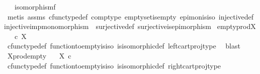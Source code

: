 \begin{isabellebody}
\ \ \ {\isachardoublequoteopen}isomorphism{\isacharparenleft}{\kern0pt}f{\isacharparenright}{\kern0pt}{\isachardoublequoteclose}\isanewline
%
\isadelimproof
\ \ %
\endisadelimproof
%
\isatagproof
{}\isamarkupfalse%
\ {\isacharparenleft}{\kern0pt}metis\ assms\ cfunc{\isacharunderscore}{\kern0pt}type{\isacharunderscore}{\kern0pt}def\ comp{\isacharunderscore}{\kern0pt}type\ emptyset{\isacharunderscore}{\kern0pt}is{\isacharunderscore}{\kern0pt}empty\ epi{\isacharunderscore}{\kern0pt}mon{\isacharunderscore}{\kern0pt}is{\isacharunderscore}{\kern0pt}iso\ injective{\isacharunderscore}{\kern0pt}def\ injective{\isacharunderscore}{\kern0pt}imp{\isacharunderscore}{\kern0pt}monomorphism\ \ surjective{\isacharunderscore}{\kern0pt}def\ surjective{\isacharunderscore}{\kern0pt}is{\isacharunderscore}{\kern0pt}epimorphism{\isacharparenright}{\kern0pt}%
\endisatagproof
{\isafoldproof}%
%
\isadelimproof
\isanewline
%
\endisadelimproof
\isanewline
{}\isamarkupfalse%
\ empty{\isacharunderscore}{\kern0pt}prod{\isacharunderscore}{\kern0pt}X{\isacharcolon}{\kern0pt}\isanewline
\ \ {\isachardoublequoteopen}{\isasymemptyset}\ {\isasymtimes}\isactrlsub c\ X\ {\isasymcong}\ {\isasymemptyset}{\isachardoublequoteclose}\isanewline
%
\isadelimproof
\ \ %
\endisadelimproof
%
\isatagproof
{}\isamarkupfalse%
\ cfunc{\isacharunderscore}{\kern0pt}type{\isacharunderscore}{\kern0pt}def\ function{\isacharunderscore}{\kern0pt}to{\isacharunderscore}{\kern0pt}empty{\isacharunderscore}{\kern0pt}is{\isacharunderscore}{\kern0pt}iso\ is{\isacharunderscore}{\kern0pt}isomorphic{\isacharunderscore}{\kern0pt}def\ left{\isacharunderscore}{\kern0pt}cart{\isacharunderscore}{\kern0pt}proj{\isacharunderscore}{\kern0pt}type\ \isamarkupfalse%
\ blast%
\endisatagproof
{\isafoldproof}%
%
\isadelimproof
\isanewline
%
\endisadelimproof
\isanewline
{}\isamarkupfalse%
\ X{\isacharunderscore}{\kern0pt}prod{\isacharunderscore}{\kern0pt}empty{\isacharcolon}{\kern0pt}\ \isanewline
\ \ {\isachardoublequoteopen}X\ {\isasymtimes}\isactrlsub c\ {\isasymemptyset}\ {\isasymcong}\ {\isasymemptyset}{\isachardoublequoteclose}\isanewline
%
\isadelimproof
\ \ %
\endisadelimproof
%
\isatagproof
{}\isamarkupfalse%
\ cfunc{\isacharunderscore}{\kern0pt}type{\isacharunderscore}{\kern0pt}def\ function{\isacharunderscore}{\kern0pt}to{\isacharunderscore}{\kern0pt}empty{\isacharunderscore}{\kern0pt}is{\isacharunderscore}{\kern0pt}iso\ is{\isacharunderscore}{\kern0pt}isomorphic{\isacharunderscore}{\kern0pt}def\ right{\isacharunderscore}{\kern0pt}cart{\isacharunderscore}{\kern0pt}proj{\isacharunderscore}{\kern0pt}type\ \isamarkupfalse%

\end{isabellebody}
